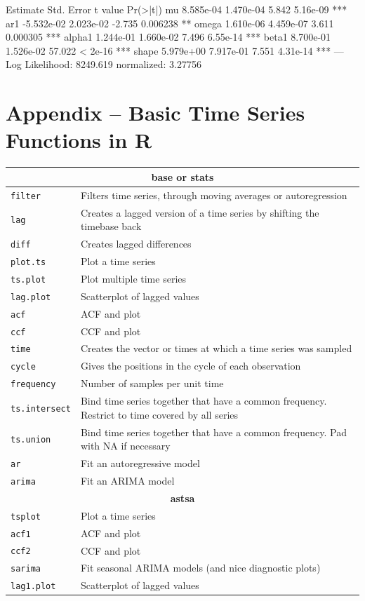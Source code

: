 \begin{samepage}
\begin{textcode}
         Estimate  Std. Error  t value Pr(>|t|)    
mu      8.585e-04   1.470e-04    5.842 5.16e-09 ***
ar1    -5.532e-02   2.023e-02   -2.735 0.006238 ** 
omega   1.610e-06   4.459e-07    3.611 0.000305 ***
alpha1  1.244e-01   1.660e-02    7.496 6.55e-14 ***
beta1   8.700e-01   1.526e-02   57.022  < 2e-16 ***
shape   5.979e+00   7.917e-01    7.551 4.31e-14 ***
---
Log Likelihood:
 8249.619    normalized:  3.27756 
\end{textcode}
\end{samepage}

\section*{Appendix -- Basic Time Series Functions in R}

\renewcommand{\arraystretch}{1.25}
\begin{tabularx}{\textwidth}{l|X} \hline
\multicolumn{2}{c}{\textbf{base or stats}} \\ \hline
\texttt{filter} & Filters time series, through moving averages or autoregression \\
\texttt{lag} & Creates a lagged version of a time series by shifting the timebase back \\
\texttt{diff} & Creates lagged differences \\ 
\texttt{plot.ts} & Plot a time series \\
\texttt{ts.plot} & Plot multiple time series \\
\texttt{lag.plot} & Scatterplot of lagged values \\
\texttt{acf} & ACF and plot \\
\texttt{ccf} & CCF and plot \\ 
\texttt{time} & Creates the vector or times at which a time series was sampled \\
\texttt{cycle} & Gives the positions in the cycle of each observation \\
\texttt{frequency} & Number of samples per unit time \\
\texttt{ts.intersect} & Bind time series together that have a common frequency. Restrict to time covered by all series \\
\texttt{ts.union} & Bind time series together that have a common frequency. Pad with NA if necessary \\ 
\texttt{ar} & Fit an autoregressive model \\ 
\texttt{arima} & Fit an ARIMA model \\ \hline
\multicolumn{2}{c}{\textbf{astsa}} \\ \hline
\texttt{tsplot} & Plot a time series \\
\texttt{acf1} & ACF and plot \\
\texttt{ccf2} & CCF and plot \\
\texttt{sarima} & Fit seasonal ARIMA models (and nice diagnostic plots) \\
\texttt{lag1.plot} & Scatterplot of lagged values \\ \hline
\end{tabularx}

